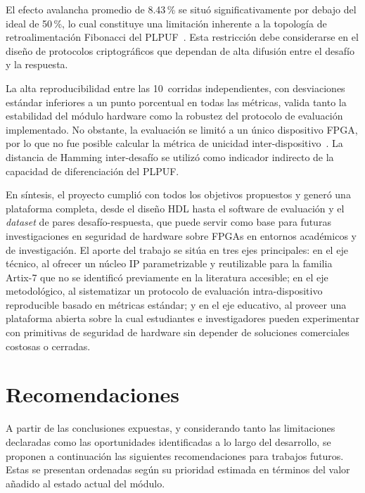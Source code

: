 El efecto avalancha promedio de 8.43\,\% se situó significativamente por
debajo del ideal de 50\,\%, lo cual constituye una limitación inherente a la
topología de retroalimentación Fibonacci del
PLPUF~\cite{alsharkawy_2024_plpufs}. Esta restricción debe considerarse en
el diseño de protocolos criptográficos que dependan de alta difusión entre el
desafío y la respuesta.

La alta reproducibilidad entre las 10~corridas independientes, con
desviaciones estándar inferiores a un punto porcentual en todas las métricas,
valida tanto la estabilidad del módulo hardware como la robustez del protocolo
de evaluación implementado. No obstante, la evaluación se limitó a un único
dispositivo FPGA, por lo que no fue posible calcular la métrica de unicidad
inter-dispositivo~\cite{wilde_2020_confidence}. La distancia de Hamming
inter-desafío se utilizó como indicador indirecto de la capacidad de
diferenciación del PLPUF.

En síntesis, el proyecto cumplió con todos los objetivos propuestos y generó
una plataforma completa, desde el diseño HDL hasta el software de evaluación
y el \textit{dataset} de pares desafío-respuesta, que puede servir como base
para futuras investigaciones en seguridad de hardware sobre FPGAs en
entornos académicos y de investigación. El aporte del trabajo se sitúa en
tres ejes principales: en el eje técnico, al ofrecer un núcleo IP
parametrizable y reutilizable para la familia Artix-7 que no se identificó
previamente en la literatura accesible; en el eje metodológico, al
sistematizar un protocolo de evaluación intra-dispositivo reproducible
basado en métricas estándar; y en el eje educativo, al proveer una
plataforma abierta sobre la cual estudiantes e investigadores pueden
experimentar con primitivas de seguridad de hardware sin depender de
soluciones comerciales costosas o cerradas.

\section{Recomendaciones}

A partir de las conclusiones expuestas, y considerando tanto las
limitaciones declaradas como las oportunidades identificadas a lo largo del
desarrollo, se proponen a continuación las siguientes recomendaciones para
trabajos futuros. Estas se presentan ordenadas según su prioridad estimada
en términos del valor añadido al estado actual del módulo.


